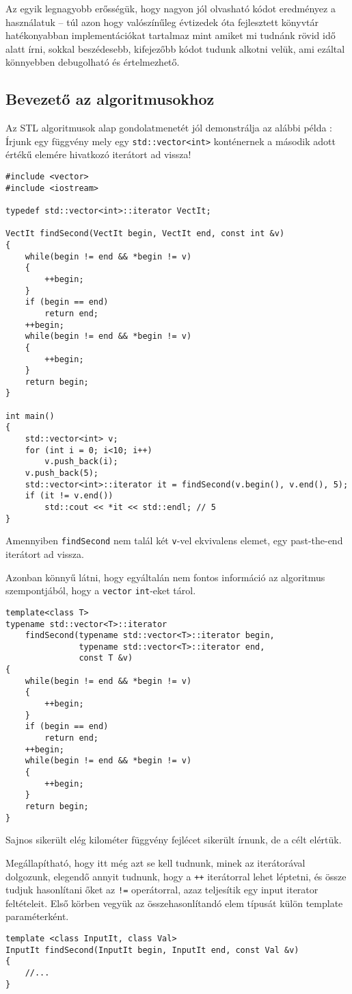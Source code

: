 \documentclass[a4paper,11.5pt,table]{article}
\begin{document}
	Az egyik legnagyobb erősségük, hogy nagyon jól olvasható kódot eredményez a használatuk -- túl azon hogy valószínűleg évtizedek óta fejlesztett könyvtár hatékonyabban implementációkat tartalmaz mint amiket mi tudnánk rövid idő alatt írni, sokkal beszédesebb, kifejezőbb kódot tudunk alkotni velük, ami ezáltal könnyebben debugolható és értelmezhető.
	\subsection{Bevezető az algoritmusokhoz}
	
	Az STL algoritmusok alap gondolatmenetét jól demonstrálja az alábbi példa : Írjunk egy függvény mely egy \texttt{std::vector<int>} konténernek a második adott értékű elemére hivatkozó iterátort ad vissza!
	\begin{lstlisting}
#include <vector>
#include <iostream>

typedef std::vector<int>::iterator VectIt;

VectIt findSecond(VectIt begin, VectIt end, const int &v)
{
	while(begin != end && *begin != v)
	{
		++begin;
	}
	if (begin == end)
		return end;
	++begin;
	while(begin != end && *begin != v)
	{
		++begin;
	}
	return begin;
}

int main()
{
	std::vector<int> v;
	for (int i = 0; i<10; i++)
		v.push_back(i);
	v.push_back(5);
	std::vector<int>::iterator it = findSecond(v.begin(), v.end(), 5);
	if (it != v.end())
		std::cout << *it << std::endl; // 5
}
	\end{lstlisting}
	Amennyiben \texttt{findSecond} nem talál két \texttt{v}-vel ekvivalens elemet, egy past-the-end iterátort ad vissza.
	
	\smallskip
	Azonban könnyű látni, hogy egyáltalán nem fontos információ az algoritmus szempontjából, hogy a \texttt{vector} \texttt{int}-eket tárol.
	\begin{lstlisting}
template<class T>
typename std::vector<T>::iterator 
	findSecond(typename std::vector<T>::iterator begin, 
			   typename std::vector<T>::iterator end, 
			   const T &v)
{
	while(begin != end && *begin != v)
	{
		++begin;
	}
	if (begin == end)
		return end;
	++begin;
	while(begin != end && *begin != v)
	{
		++begin;
	}
	return begin;
}
	\end{lstlisting}
	Sajnos sikerült elég kilométer függvény fejlécet sikerült írnunk, de a célt elértük.
	
	\smallskip
	Megállapítható, hogy itt még azt se kell tudnunk, minek az iterátorával dolgozunk, elegendő annyit tudnunk, hogy a \texttt{++} iterátorral lehet léptetni, és össze tudjuk hasonlítani őket az \texttt{!=} operátorral, azaz teljesítik egy input iterator feltételeit. Első körben vegyük az összehasonlítandó elem típusát külön template paraméterként.
	\begin{lstlisting}
template <class InputIt, class Val>
InputIt findSecond(InputIt begin, InputIt end, const Val &v)
{
	//...
}
	\end{lstlisting}
	
\end{document}
